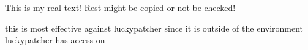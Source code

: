 This is my real text! Rest might be copied or not be checked!

this is most effective against luckypatcher since it is outside of the environment luckypatcher has access on
